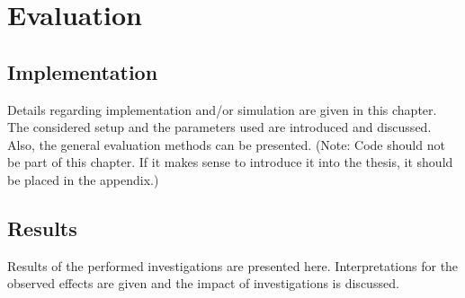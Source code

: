 \chapter{Evaluation}
\section{Implementation}
Details regarding implementation and/or simulation are given in this chapter. The considered setup and the parameters used are introduced and discussed. Also, the general evaluation methods can be presented. (Note: Code should not be part of this chapter. If it makes sense to introduce it into the thesis, it should be placed in the appendix.)

\section{Results}
Results of the performed investigations are presented here. Interpretations for the observed effects are given and the impact of investigations is discussed. 
